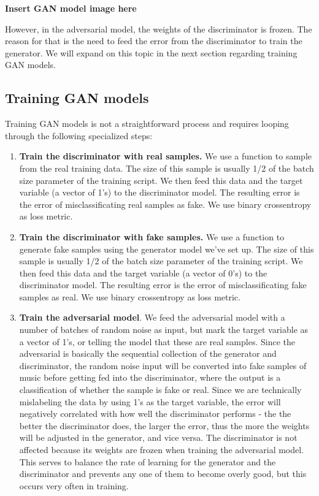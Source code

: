 \documentclass[12pt,oneside]{chicagocapstone}
\providecommand{\tightlist}{%
  \setlength{\itemsep}{0pt}\setlength{\parskip}{0pt}}
\begin{document}
\textbf{Insert GAN model image here}

However, in the adversarial model, the weights of the discriminator is frozen. The reason for that is the need to feed the error from the discriminator to train the generator. We will expand on this topic in the next section regarding training GAN models.

\hypertarget{training-gan-models}{%
\subsection*{Training GAN models}\label{training-gan-models}}

Training GAN models is not a straightforward process and requires looping through the following specialized steps:
\begin{enumerate}
\def\labelenumi{\arabic{enumi}.}
\tightlist
\item
  \textbf{Train the discriminator with real samples.} We use a function to sample from the real training data. The size of this sample is usually 1/2 of the batch size parameter of the training script. We then feed this data and the target variable (a vector of 1's) to the discriminator model. The resulting error is the error of misclassificating real samples as fake. We use binary crossentropy as loss metric.
\item
  \textbf{Train the discriminator with fake samples.} We use a function to generate fake samples using the generator model we've set up. The size of this sample is usually 1/2 of the batch size parameter of the training script. We then feed this data and the target variable (a vector of 0's) to the discriminator model. The resulting error is the error of misclassificating fake samples as real. We use binary crossentropy as loss metric.
\item
  \textbf{Train the adversarial model}. We feed the adversarial model with a number of batches of random noise as input, but mark the target variable as a vector of 1's, or telling the model that these are real samples. Since the adversarial is basically the sequential collection of the generator and discriminator, the random noise input will be converted into fake samples of music before getting fed into the discriminator, where the output is a classification of whether the sample is fake or real. Since we are technically mislabeling the data by using 1's as the target variable, the error will negatively correlated with how well the discriminator performs - the the better the discriminator does, the larger the error, thus the more the weights will be adjusted in the generator, and vice versa. The discriminator is not affected because its weights are frozen when training the adversarial model. This serves to balance the rate of learning for the generator and the discriminator and prevents any one of them to become overly good, but this occurs very often in training.
\end{enumerate}
\end{document}
